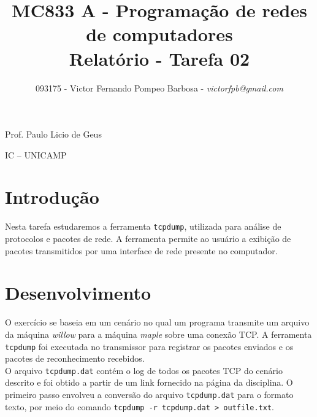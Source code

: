 \documentclass[a4paper,10pt]{article}
\begin{document}


\title{MC833 A - Programação de redes de computadores\\
Relatório - Tarefa 02}

\author {093175 - Victor Fernando Pompeo Barbosa - \textit{victorfpb@gmail.com}}


\maketitle

\centerline{Prof. Paulo Licio de Geus}
\centerline{IC -- UNICAMP}

\vspace{2cm}
\tableofcontents
    
\newpage
\section{Introdução}
\hspace{14pt}

    Nesta tarefa estudaremos a ferramenta {\tt tcpdump}, utilizada para análise de protocolos e pacotes de rede. A ferramenta permite ao usuário a exibição de pacotes transmitidos por uma interface de rede presente no computador. 


\section{Desenvolvimento}

O exercício se baseia em um cenário no qual um programa transmite um arquivo da máquina \textit{willow} para a máquina \textit{maple} sobre uma conexão TCP. A ferramenta {\tt tcpdump} foi executada no transmissor para registrar os pacotes enviados e os pacotes de reconhecimento recebidos.\\

O arquivo {\tt tcpdump.dat} contém o log de todos os pacotes TCP do cenário descrito e foi obtido a partir de um link fornecido na página da disciplina. O primeiro passo envolveu a conversão do arquivo {\tt tcpdump.dat} para o formato texto, por meio do comando {\tt tcpdump -r tcpdump.dat > outfile.txt}. \\
\end{document}
